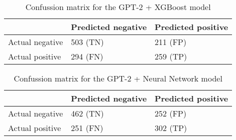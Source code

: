 \begin{table}[!htbp]
\centering
{
\makegapedcells
\begin{tabular}{lll}
                & Predicted negative & Predicted positive \\
\hline
Actual negative & 503 (TN)           & 211 (FP) \\
Actual positive & 294 (FN)           & 259 (TP) \\
\hline
\end{tabular}
}
\caption{Confussion matrix for the GPT-2 + XGBoost model}
\label{gpt2xgb_cm}
\end{table}

\begin{table}[!htbp]
\centering
{
\makegapedcells
\begin{tabular}{lll}
                & Predicted negative & Predicted positive \\
\hline
Actual negative & 462 (TN)           & 252 (FP) \\
Actual positive & 251 (FN)           & 302 (TP) \\
\hline
\end{tabular}
}
\caption{Confussion matrix for the GPT-2 + Neural Network model}
\label{gpt2nn_cm}
\end{table}